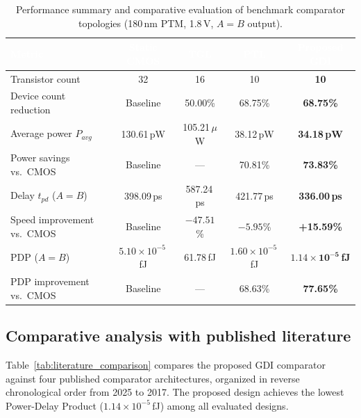 \documentclass[final,5p,times,twocolumn]{elsarticle}
\begin{document}
\begin{table}[t]
    \centering
    \caption{Performance summary and comparative evaluation of benchmark comparator topologies (180\,nm PTM, 1.8\,V, $A=B$ output).}
    \label{tab:benchmark_results}
    \renewcommand{\arraystretch}{1.4}
    \setlength{\tabcolsep}{10pt}
    {\small
    \begin{tabular}{|l|c|c|c|c|}
        \hline
        \rowcolor{worddarkblue}
        \textcolor{white}{\textbf{Metric}} & 
        \textcolor{white}{\textbf{Static CMOS}} & 
        \textcolor{white}{\textbf{TGL}} & 
        \textcolor{white}{\textbf{PTL}} & 
        \textcolor{white}{\textbf{Proposed GDI}} \\
        \hline
        Transistor count & 32 & 16 & 10 & \textbf{10} \\
        \hline
        \rowcolor{wordzebra}
        Device count reduction & Baseline & 50.00\% & 68.75\% & \textbf{68.75\%} \\
        \hline
        Average power $P_{avg}$ & 130.61\,pW & 105.21\,$\mu$W & 38.12\,pW & \textbf{34.18\,pW} \\
        \hline
        \rowcolor{wordzebra}
        Power savings vs.\ CMOS & Baseline & --- & 70.81\% & \textbf{73.83\%} \\
        \hline
        Delay $t_{pd}$ ($A=B$) & 398.09\,ps & 587.24\,ps & 421.77\,ps & \textbf{336.00\,ps} \\
        \hline
        \rowcolor{wordzebra}
        Speed improvement vs.\ CMOS & Baseline & $-47.51$\% & $-5.95$\% & \textbf{+15.59\%} \\
        \hline
        PDP ($A=B$) & $5.10 \times 10^{-5}$\,fJ & 61.78\,fJ & $1.60 \times 10^{-5}$\,fJ & $\mathbf{1.14 \times 10^{-5}}$\,\textbf{fJ} \\
        \hline
        \rowcolor{wordzebra}
        PDP improvement vs.\ CMOS & Baseline & --- & 68.63\% & \textbf{77.65\%} \\
        \hline
    \end{tabular}
    }
\end{table}

\subsection{Comparative analysis with published literature}

Table~\ref{tab:literature_comparison} compares the proposed GDI comparator against four published comparator architectures, organized in reverse chronological order from 2025 to 2017. The proposed design achieves the lowest Power-Delay Product ($1.14 \times 10^{-5}$\,fJ) among all evaluated designs.
\end{document}
